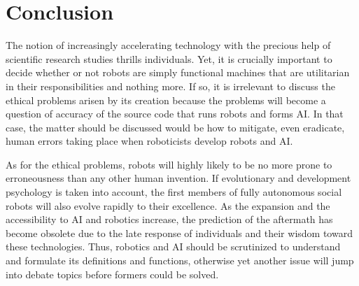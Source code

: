 \documentclass[man]{apa6}
\begin{document}
\section{Conclusion}
The notion of increasingly accelerating technology with the precious help of scientific research studies thrills individuals.
Yet, it is crucially important to decide whether or not robots are simply functional machines that are utilitarian in their responsibilities and nothing more.
If so, it is irrelevant to discuss the ethical problems arisen by its creation because the problems will become a question of accuracy of the source code that runs robots and forms AI.
In that case, the matter should be discussed would be how to mitigate, even eradicate, human errors taking place when roboticists develop robots and AI. \par
As for the ethical problems, robots will highly likely to be no more prone to erroneousness than any other human invention.
If evolutionary and development psychology is taken into account, the first members of fully autonomous social robots will also evolve rapidly to their excellence.
As the expansion and the accessibility to AI and robotics increase, the prediction of the aftermath has become obsolete due to the late response of individuals and their wisdom toward these technologies.
Thus, robotics and AI should be scrutinized to understand and formulate its definitions and functions, otherwise yet another issue will jump into debate topics before formers could be solved.


\end{document}
